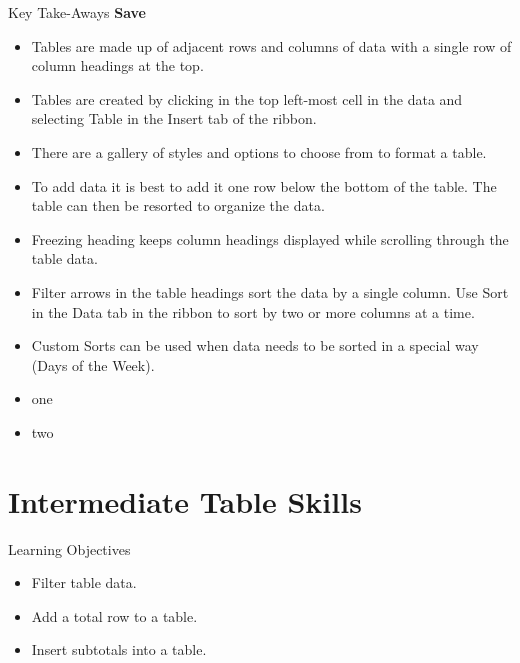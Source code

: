 \begin{center}
	\begin{tkwbox}{Key Take-Aways}
		\textbf{Save}
		\\
		\begin{itemize}
			\setlength{\itemsep}{0pt}
			\setlength{\parskip}{0pt}
			\setlength{\parsep}{0pt}

			\item Tables are made up of adjacent rows and columns of data with a single row of column headings at the top.
			\item Tables are created by clicking in the top left-most cell in the data and selecting Table in the Insert tab of the ribbon.
			\item There are a gallery of styles and options to choose from to format a table.
			\item To add data it is best to add it one row below the bottom of the table. The table can then be resorted to organize the data.
			\item Freezing heading keeps column headings displayed while scrolling through the table data.
			\item Filter arrows in the table headings sort the data by a single column. Use Sort in the Data tab in the ribbon to sort by two or more columns at a time.
			\item Custom Sorts can be used when data needs to be sorted in a special way (\ie Days of the Week).
			
			\item one
			\item two
			
		\end{itemize}
	\end{tkwbox}
\end{center}



\section{Intermediate Table Skills}


\begin{center}
	\begin{objbox}{Learning Objectives}
		\begin{itemize}
			\setlength{\itemsep}{0pt}
			\setlength{\parskip}{0pt}
			\setlength{\parsep}{0pt}

			\item Filter table data.
			\item Add a total row to a table.
			\item Insert subtotals into a table.
			
		\end{itemize}
	\end{objbox}
\end{center}


